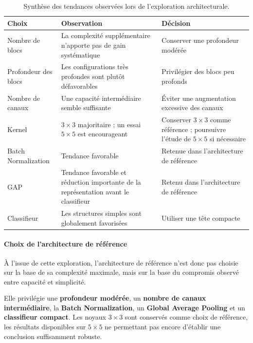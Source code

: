\begin{table}[H]
\centering
\caption{Synthèse des tendances observées lors de l'exploration architecturale.}
\label{tab:architecture-impact}
\begin{tabularx}{\textwidth}{>{\raggedright\arraybackslash}p{3.2cm} >{\raggedright\arraybackslash}X >{\raggedright\arraybackslash}X}
\toprule
\textbf{Choix} & \textbf{Observation} & \textbf{Décision} \\
\midrule

Nombre de blocs
& La complexité supplémentaire n'apporte pas de gain systématique
& Conserver une profondeur modérée \\

Profondeur des blocs
& Les configurations très profondes sont plutôt défavorables
& Privilégier des blocs peu profonds \\

Nombre de canaux
& Une capacité intermédiaire semble suffisante
& Éviter une augmentation excessive des canaux \\

Kernel
& $3\times3$ majoritaire ; un essai $5\times5$ est encourageant
& Conserver $3\times3$ comme référence ; poursuivre l'étude de $5\times5$ si nécessaire \\

Batch Normalization
& Tendance favorable
& Retenue dans l'architecture de référence \\

GAP
& Tendance favorable et réduction importante de la représentation avant le classifieur
& Retenu dans l'architecture de référence \\

Classifieur
& Les structures simples sont globalement favorisées
& Utiliser une tête compacte \\

\bottomrule
\end{tabularx}
\end{table}

\paragraph{Choix de l'architecture de référence}

À l'issue de cette exploration, l'architecture de référence n'est donc pas choisie sur la base de sa complexité maximale, mais sur la base du compromis observé entre capacité et simplicité.

Elle privilégie une \textbf{profondeur modérée}, un \textbf{nombre de canaux intermédiaire}, la \textbf{Batch Normalization}, un \textbf{Global Average Pooling} et un \textbf{classifieur compact}.
Les noyaux $3\times3$ sont conservés comme choix de référence, les résultats disponibles sur $5\times5$ ne permettant pas encore d'établir une conclusion suffisamment robuste.

